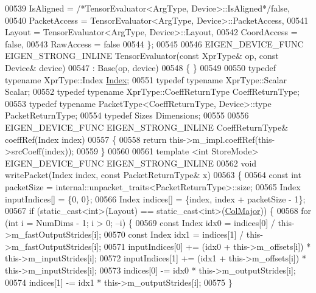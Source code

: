 \begin{DoxyCode}
00539     IsAligned = \textcolor{comment}{/*TensorEvaluator<ArgType, Device>::IsAligned*/}\textcolor{keyword}{false},
00540     PacketAccess = TensorEvaluator<ArgType, Device>::PacketAccess,
00541     Layout = TensorEvaluator<ArgType, Device>::Layout,
00542     CoordAccess = \textcolor{keyword}{false},
00543     RawAccess = \textcolor{keyword}{false}
00544   \};
00545 
00546   EIGEN\_DEVICE\_FUNC EIGEN\_STRONG\_INLINE TensorEvaluator(\textcolor{keyword}{const} XprType& op, \textcolor{keyword}{const} Device& device)
00547     : Base(op, device)
00548     \{ \}
00549 
00550   \textcolor{keyword}{typedef} \textcolor{keyword}{typename} XprType::Index \hyperlink{namespace_eigen_a62e77e0933482dafde8fe197d9a2cfde}{Index};
00551   \textcolor{keyword}{typedef} \textcolor{keyword}{typename} XprType::Scalar Scalar;
00552   \textcolor{keyword}{typedef} \textcolor{keyword}{typename} XprType::CoeffReturnType CoeffReturnType;
00553   \textcolor{keyword}{typedef} \textcolor{keyword}{typename} PacketType<CoeffReturnType, Device>::type PacketReturnType;
00554   \textcolor{keyword}{typedef} Sizes Dimensions;
00555 
00556   EIGEN\_DEVICE\_FUNC EIGEN\_STRONG\_INLINE CoeffReturnType& coeffRef(Index index)
00557   \{
00558     \textcolor{keywordflow}{return} this->m\_impl.coeffRef(this->srcCoeff(index));
00559   \}
00560 
00561   \textcolor{keyword}{template} <\textcolor{keywordtype}{int} StoreMode> EIGEN\_DEVICE\_FUNC EIGEN\_STRONG\_INLINE
00562   \textcolor{keywordtype}{void} writePacket(Index index, \textcolor{keyword}{const} PacketReturnType& x)
00563   \{
00564     \textcolor{keyword}{const} \textcolor{keywordtype}{int} packetSize = internal::unpacket\_traits<PacketReturnType>::size;
00565     Index inputIndices[] = \{0, 0\};
00566     Index indices[] = \{index, index + packetSize - 1\};
00567     \textcolor{keywordflow}{if} (static\_cast<int>(Layout) == static\_cast<int>(\hyperlink{group__enums_ggaacded1a18ae58b0f554751f6cdf9eb13a0cbd4bdd0abcfc0224c5fcb5e4f6669a}{ColMajor})) \{
00568       \textcolor{keywordflow}{for} (\textcolor{keywordtype}{int} i = NumDims - 1; i > 0; --i) \{
00569         \textcolor{keyword}{const} Index idx0 = indices[0] / this->m\_fastOutputStrides[i];
00570         \textcolor{keyword}{const} Index idx1 = indices[1] / this->m\_fastOutputStrides[i];
00571         inputIndices[0] += (idx0 + this->m\_offsets[i]) * this->m\_inputStrides[i];
00572         inputIndices[1] += (idx1 + this->m\_offsets[i]) * this->m\_inputStrides[i];
00573         indices[0] -= idx0 * this->m\_outputStrides[i];
00574         indices[1] -= idx1 * this->m\_outputStrides[i];
00575       \}

\end{DoxyCode}
